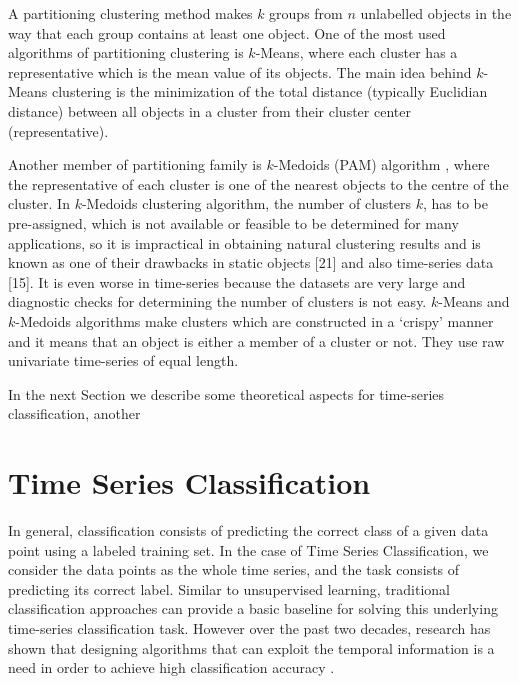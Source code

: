 A partitioning clustering method makes $k$ groups from $n$ unlabelled objects in the way that each group contains at least one object. One of the most used algorithms of partitioning clustering is $k$-Means, where each cluster has a representative which is the mean value of its objects. The main idea behind $k$-Means clustering is the minimization of the total distance (typically Euclidian distance) between all objects in a cluster from their cluster center (representative).

Another member of partitioning family is $k$-Medoids (PAM) algorithm \cite{Kaufman2009}, where the representative of each cluster is one of the nearest objects to the centre of the cluster. In $k$-Medoids clustering algorithm, the number of clusters $k$, has to be pre-assigned, which is not available or feasible to be determined for many applications, so it is impractical in obtaining natural clustering results and is known as one of their drawbacks in static objects [21] and also time-series data [15]. It is even worse in time-series because the datasets are very large and diagnostic checks for determining the number of clusters is not easy. %
$k$-Means and $k$-Medoids algorithms make clusters which are constructed in a `crispy' manner and it means that an object is either a member of a cluster or not. They use raw univariate time-series of equal length. 






In the next Section we describe some theoretical aspects for time-series classification, another 

\section{Time Series Classification} 
\label{Sec:TimeSeriesClassification}

In general, classification consists of predicting the correct class of a given data point using a labeled training set. In the case of Time Series Classification, we consider the data points as the whole time series, and the task consists of predicting its correct label. Similar to unsupervised learning, traditional classification approaches can provide a basic baseline for solving this underlying time-series classification task. However over the past two decades, research has shown that designing algorithms that can exploit the temporal information is a need in order to achieve high classification accuracy \cite{Fawaz2019}. 

